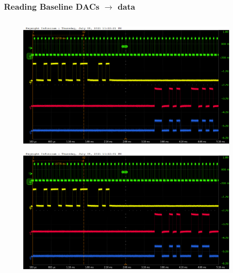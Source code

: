 \documentclass[aspectratio=169]{beamer}
\begin{document}
	\begin{frame}
	\frametitle{Reading Baseline DACs $\rightarrow$ data}
	\begin{columns}
		\begin{center}
			\begin{figure}
				\includegraphics[width=0.55 \textwidth]{IMG/probe/09-08-2021_ch05-read53-baselinedac1.png}
				\caption{}
			\end{figure}
			\begin{figure}
				\includegraphics[width=0.55 \textwidth]{IMG/probe/09-08-2021_ch05-read54-baselinedac1.png}
				\caption{}
			\end{figure}		
		\end{center}
		

\end{columns}
\end{frame}
\end{document}
